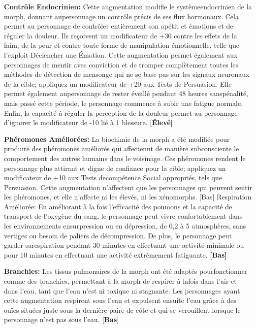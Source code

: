 {{\textbf{Contrôle Endocrinien:} Cette augmentation modifie le systèmeendocrinien de la morph, donnant aupersonnage un contrôle précis de ses flux hormonaux. Cela permet au personnage de contrôler entièrement son apétit et émotions et de réguler la douleur. Ils reçoivent un modificateur de +30 contre les effets de la faim, de la peur et contre toute forme de manipulation émotionnelle, telle que l'exploit Déclencher une Émotion. Cette augmentation permet également aux personnages de mentir avec conviction et de tromper complètement toutes les méthodes de détection de mensonge qui ne se base pas sur les signaux neuronaux de la cible; appliquez un modificateur de +20 aux Tests de Persuasion. Elle permet également aupersonnage de rester éveillé pendant 48 heures sanspénalité, mais passé cette période, le personnage commence à subir une fatigue normale. Enfin, la capacité à réguler la perception de la douleur permet au personnage d'ignorer le modificateur de -10 lié à 1 blessure. \textbf{[Élevé]} 

\textbf{Phéromones Améliorées: }La biochimie de la morph a été modifiée pour produire des phéromones améliorés qui affectennt de manière subconsciente le comportement des autres humains dans le voisinage. Ces phéromones rendent le personnage plus attirant et digne de confiance pour la cible; appliquez un modificateur de +10 aux Tests decompétence Social appropriés, tels que Persuasion. Cette augmentation n'affectent que les personnages qui peuvent sentir les phéromones, et elle n'affecte ni les élevés, ni les xénomorphs. [Bas] Respiration Améliorée: En améliorant à la fois l'efficacité des poumons et la capacité de transport de l'oxygène du sang, le personnage peut vivre confortablement dans les environnements ensurpression ou en dépression, de 0,2 à 5 atmosphères, sans vertiges ou besoin de paliers de décompression. De plus, le personnage peut garder sarespiration pendant 30 minutes en effectuant une activité minimale ou pour 10 minutes en effectuant une activité extrêmement fatiguante. \textbf{[Bas]} 

\textbf{Branchies:} Les tissus pulmonaires de la morph ont été adaptés pourfonctionner comme des branchies, permettant à la morph de respirer à lafois dans l'air et dans l'eau, tant que l'eau n'est ni toxique ni stagnante. Les personnages ayant cette augmentation respirent sous l'eau et expulsent ensuite l'eau grâce à des ouïes situées juste sous la dernière paire de côte et qui se verouillent lorsque le personnage n'est pas sous l'eau. \textbf{[Bas]} 

}}
